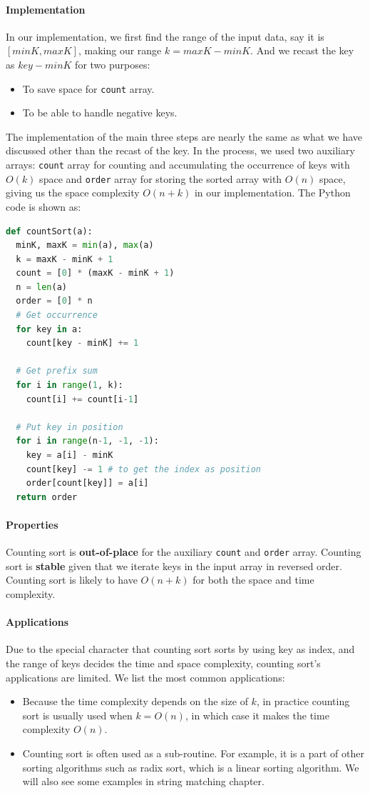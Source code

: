 \documentclass[../main.tex]{subfiles}
\begin{document}
\paragraph{Implementation} In our implementation, we first find the range of the input data, say it is $[minK, maxK]$, making our range $k = maxK-minK$. And we recast the key as $key - minK$ for two purposes:
\begin{itemize}
    \item To save space for \texttt{count} array.
    \item To be able to handle negative keys.
\end{itemize}The implementation of the main three steps are  nearly the same as what we have discussed other than the recast of the key. In the process, we used two auxiliary arrays:  \texttt{count} array for counting and accumulating the occurrence of keys with $O(k)$ space and \texttt{order} array for storing the sorted array with $O(n)$ space, giving us the space complexity $O(n+k)$ in our implementation. The Python code is shown as:
\begin{lstlisting}[language=Python]
def countSort(a):
  minK, maxK = min(a), max(a)
  k = maxK - minK + 1
  count = [0] * (maxK - minK + 1)
  n = len(a)
  order = [0] * n
  # Get occurrence
  for key in a:
    count[key - minK] += 1
  
  # Get prefix sum
  for i in range(1, k):
    count[i] += count[i-1]
    
  # Put key in position
  for i in range(n-1, -1, -1):
    key = a[i] - minK
    count[key] -= 1 # to get the index as position
    order[count[key]] = a[i] 
  return order
\end{lstlisting}

\paragraph{Properties} Counting sort is \textbf{out-of-place} for the auxiliary \texttt{count} and \texttt{order} array.  Counting sort is \textbf{stable} given that we iterate keys in  the input array in reversed order.  Counting sort is likely to have $O(n+k)$  for both the space and time complexity. 

\paragraph{Applications} Due to the special character that counting sort sorts by using key as index, and the range of keys decides the time and space complexity, counting sort's applications are limited. We list the most common applications:
\begin{itemize}
    \item Because the time complexity depends on the size  of $k$, in practice counting sort is usually used when $k=O(n)$, in which case it makes the time complexity $O(n)$. 
    \item Counting sort is often used  as a sub-routine. For example, it is a part of other sorting algorithms such as radix sort, which is a linear sorting algorithm. We will also see some examples in string matching chapter.  
\end{itemize}
\end{document}
